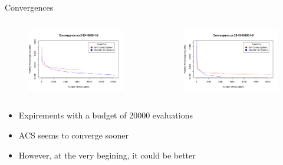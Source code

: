 \documentclass{beamer}
\begin{document}
\begin{frame}{Convergences}

    \begin{columns}[t]

        \begin{column}{0.5\textwidth}
            \begin{figure}
                \centering
                \includegraphics[scale=0.31]{conv-2-30}
            \end{figure}
        \end{column}

        \begin{column}{0.5\textwidth}
            \begin{figure}
                \centering
                \includegraphics[scale=0.31]{conv-20-10}
            \end{figure}
        \end{column}

    \end{columns}

    \begin{itemize}
        \item Expirements with a budget of 20000 evaluations
        \item ACS seems to converge sooner
        \item However, at the very begining, it could be better
    \end{itemize}

\end{frame}
\end{document}
